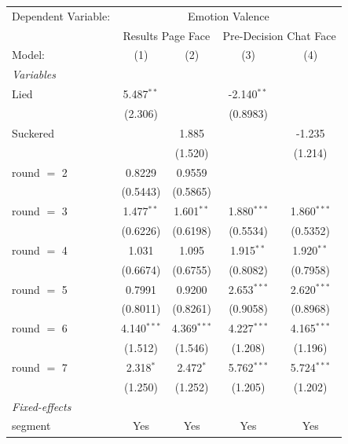 
\begingroup
\centering
\begin{tabular}{lcccc}
   \tabularnewline \midrule \midrule
   Dependent Variable: & \multicolumn{4}{c}{Emotion Valence}\\
    & \multicolumn{2}{c}{Results Page Face} & \multicolumn{2}{c}{Pre-Decision Chat Face} \\ 
   Model:       & (1)           & (2)           & (3)           & (4)\\  
   \midrule
   \emph{Variables}\\
   Lied         & 5.487$^{**}$  &               & -2.140$^{**}$ &   \\   
                & (2.306)       &               & (0.8983)      &   \\   
   Suckered     &               & 1.885         &               & -1.235\\   
                &               & (1.520)       &               & (1.214)\\   
   round $=$ 2  & 0.8229        & 0.9559        &               &   \\   
                & (0.5443)      & (0.5865)      &               &   \\   
   round $=$ 3  & 1.477$^{**}$  & 1.601$^{**}$  & 1.880$^{***}$ & 1.860$^{***}$\\   
                & (0.6226)      & (0.6198)      & (0.5534)      & (0.5352)\\   
   round $=$ 4  & 1.031         & 1.095         & 1.915$^{**}$  & 1.920$^{**}$\\   
                & (0.6674)      & (0.6755)      & (0.8082)      & (0.7958)\\   
   round $=$ 5  & 0.7991        & 0.9200        & 2.653$^{***}$ & 2.620$^{***}$\\   
                & (0.8011)      & (0.8261)      & (0.9058)      & (0.8968)\\   
   round $=$ 6  & 4.140$^{***}$ & 4.369$^{***}$ & 4.227$^{***}$ & 4.165$^{***}$\\   
                & (1.512)       & (1.546)       & (1.208)       & (1.196)\\   
   round $=$ 7  & 2.318$^{*}$   & 2.472$^{*}$   & 5.762$^{***}$ & 5.724$^{***}$\\   
                & (1.250)       & (1.252)       & (1.205)       & (1.202)\\   
   \midrule
   \emph{Fixed-effects}\\
   segment      & Yes           & Yes           & Yes           & Yes\\  

\end{tabular}
